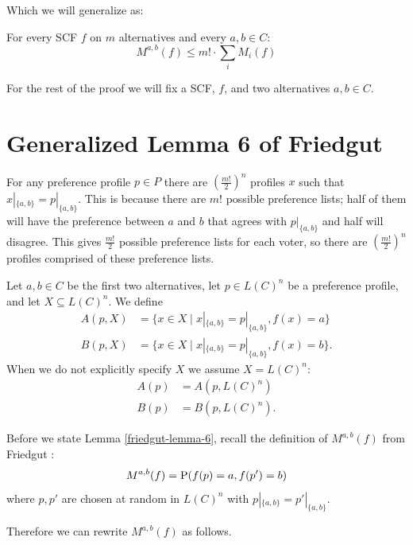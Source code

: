	Which we will generalize as:

	\begin{theorem}
		For every SCF $f$ on $m$ alternatives and every $a, b \in C$:
		\[
			M^{a, b}(f) \le m! \cdot \sum_i M_i(f)
		\]
	\end{theorem}

	For the rest of the proof we will fix a SCF, $f$, and two alternatives $a, b \in C$.


\section{Generalized Lemma 6 of Friedgut}

	For any preference profile $p \in P$ there are $(\frac{m!}{2})^n$ profiles $x$ such that $x|_{\{a, b\}} = p|_{\{a, b\}}$. This is because there are $m!$ possible preference lists; half of them will have the preference between $a$ and $b$ that agrees with $p|_{\{a, b\}}$ and half will disagree. This gives $\frac{m!}{2}$ possible preference lists for each voter, so there are $(\frac{m!}{2})^n$ profiles comprised of these preference lists.

	\begin{definition}
		Let $a, b \in C$ be the first two alternatives, let $p \in L(C)^n$ be a preference profile, and let $X \subseteq L(C)^n$. We define
		\begin{align*}
			A(p, X) &= \{x \in X \mid x|_{\{a,b\}} = p|_{\{a,b\}}, f(x) = a\} \\
			B(p, X) &= \{x \in X \mid x|_{\{a,b\}} = p|_{\{a,b\}}, f(x) = b\}.
		\end{align*}
		When we do not explicitly specify $X$ we assume $X = L(C)^n$:
		\begin{align*}
			A(p) &= A(p, L(C)^n) \\
			B(p) &= B(p, L(C)^n).
		\end{align*}
	\end{definition}

	Before we state Lemma \ref{friedgut-lemma-6}, recall the definition of $M^{a,b}(f)$ from Friedgut \cite{friedgut2008elections}:
	\[
		M^{a,b}(f) = \operatorname{P}(f(p) = a, f(p') = b)
	\]
	where $p, p'$ are chosen at random in $L(C)^n$ with $p|_{\{a,b\}} = p'|_{\{a,b\}}$.

	Therefore we can rewrite $M^{a,b}(f)$ as follows.

